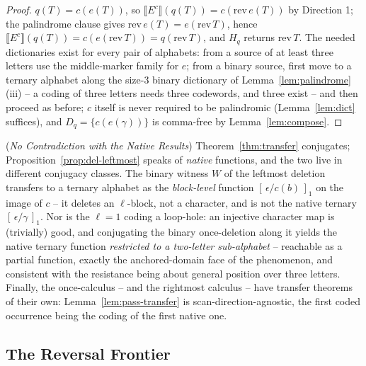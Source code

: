 \documentclass[runningheads,envcountsect]{llncs}
\renewenvironment{remark}
  {\rmfamily\trivlist\item[\hskip\labelsep{\itshape Remark.}]\ignorespaces}
  {\endtrivlist}
\begin{document}
\begin{proof}
    $q(T) = c(e(T))$, so $\llbracket E^c \rrbracket(q(T)) = c(\mathrm{rev}\, e(T))$ by Direction 1; the palindrome clause gives $\mathrm{rev}\, e(T) = e(\mathrm{rev}\, T)$, hence $\llbracket E^c \rrbracket(q(T)) = c(e(\mathrm{rev}\,T)) = q(\mathrm{rev}\,T)$, and $H_q$ returns $\mathrm{rev}\,T$. The needed dictionaries exist for every pair of alphabets: from a source of at least three letters use the middle-marker family for $e$; from a binary source, first move to a ternary alphabet along the size-3 binary dictionary of Lemma~\ref{lem:palindrome}(iii) -- a coding of three letters needs three codewords, and three exist -- and then proceed as before; $c$ itself is never required to be palindromic (Lemma~\ref{lem:dict} suffices), and $D_q = \{c(e(\gamma))\}$ is comma-free by Lemma~\ref{lem:compose}.
\end{proof}

\begin{remark}
    (\emph{No Contradiction with the Native Results})
    \label{rem:native}
    Theorem~\ref{thm:transfer} conjugates; Proposition~\ref{prop:del-leftmost} speaks of \emph{native} functions, and the two live in different conjugacy classes. The binary witness $W$ of the leftmost deletion transfers to a ternary alphabet as the \emph{block-level} function $[\,\epsilon/c(b)\,]_1$ on the image of $c$ -- it deletes an $\ell$-block, not a character, and is not the native ternary $[\,\epsilon/\gamma\,]_1$. Nor is the $\ell = 1$ coding a loop-hole: an injective character map is (trivially) good, and conjugating the binary once-deletion along it yields the native ternary function \emph{restricted to a two-letter sub-alphabet} -- reachable as a partial function, exactly the anchored-domain face of the phenomenon, and consistent with the resistance being about general position over three letters. Finally, the once-calculus -- and the rightmost calculus -- have transfer theorems of their own: Lemma~\ref{lem:pass-transfer} is scan-direction-agnostic, the first coded occurrence being the coding of the first native one.
\end{remark}

\subsection{The Reversal Frontier}
\label{ssec:frontier}
\end{document}
